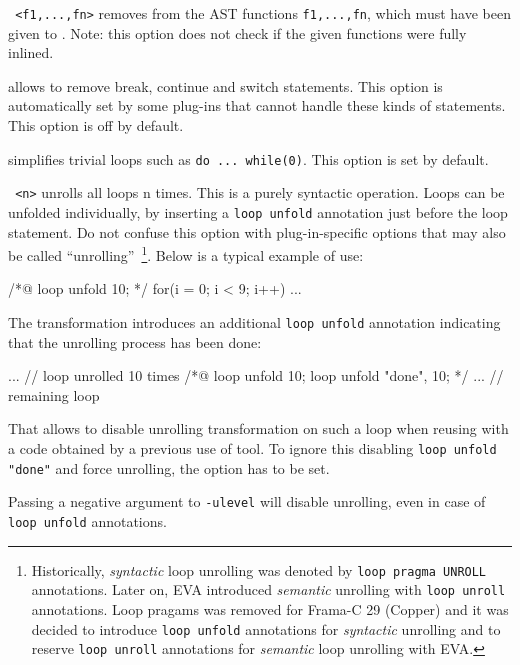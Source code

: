 \begin{description}
\item \texttt{ <f1,...,fn>} removes from the AST
  functions \texttt{f1,...,fn}, which must have been given to
  . Note: this option does not check if the given
  functions were fully inlined.

\item {} allows \FramaC to remove break, continue and
  switch statements. This option is automatically set by some plug-ins that
  cannot handle these kinds of statements. This option is off by default.

\item {} simplifies trivial loops such as
  \texttt{do ... while(0)}. This option is set by default.

\item \texttt{ <n>} unrolls all loops n times. This is a
  purely syntactic operation. Loops can be unfolded individually, by
  inserting a \verb+loop unfold+ annotation just before the loop statement. Do
  not confuse this option with plug-in-specific options that may also be called
  ``unrolling''~\cite{value}\footnote{
    Historically, \textit{syntactic} loop unrolling was denoted by
    \texttt{loop pragma UNROLL} annotations. Later on, \textsf{EVA} introduced
    \textit{semantic} unrolling with \texttt{loop unroll} annotations.
    Loop pragams was removed for Frama-C 29 (Copper) and it was
    decided to introduce \texttt{loop unfold} annotations for \textit{syntactic}
    unrolling and to reserve \texttt{loop unroll} annotations for \textit{semantic}
    loop unrolling with \textsf{EVA}.
  }. Below is a typical example of use:
\begin{ccode}
/*@ loop unfold 10; */
for(i = 0; i < 9; i++) ...
\end{ccode}
The transformation introduces an additional \verb+loop unfold+ annotation
indicating that the unrolling process has been done:
\begin{ccode}
... // loop unrolled 10 times
/*@ loop unfold 10;
    loop unfold "done", 10; */
  ... // remaining loop
\end{ccode}
That allows to disable unrolling transformation on such a loop when reusing
\FramaC with a code obtained by a previous use of \FramaC tool.
To ignore this disabling \verb+loop unfold "done"+ and force unrolling,
the option \texttt{} has to be set.

Passing a negative argument to \texttt{-ulevel} will disable unrolling, even
in case of \verb+loop unfold+ annotations.
\end{description}


